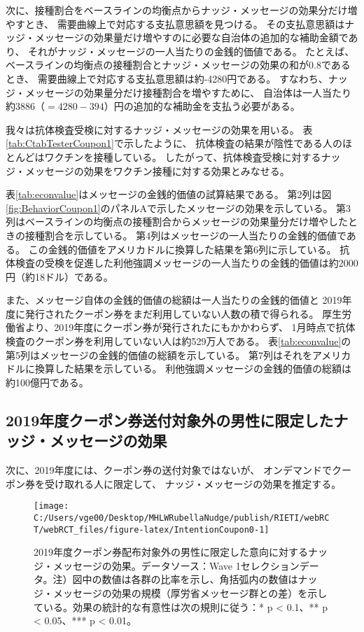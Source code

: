 \documentclass[
  11pt,
  a4paper,
]{article}
\begin{document}
次に、接種割合をベースラインの均衡点からナッジ・メッセージの効果分だけ増やすとき、
需要曲線上で対応する支払意思額を見つける。
その支払意思額はナッジ・メッセージの効果量だけ増やすのに必要な自治体の追加的な補助金額であり、
それがナッジ・メッセージの一人当たりの金銭的価値である。
たとえば、ベースラインの均衡点の接種割合とナッジ・メッセージの効果の和が0.8であるとき、
需要曲線上で対応する支払意思額は約-4280円である。
すなわち、ナッジ・メッセージの効果量分だけ接種割合を増やすために、
自治体は一人当たり約3886（\(=4280-394\)）円の追加的な補助金を支払う必要がある。

我々は抗体検査受検に対するナッジ・メッセージの効果を用いる。
表\ref{tab:CtabTesterCoupon1}で示したように、
抗体検査の結果が陰性である人のほとんどはワクチンを接種している。
したがって、抗体検査受検に対するナッジ・メッセージの効果をワクチン接種に対する効果とみなせる。

表\ref{tab:econvalue}はメッセージの金銭的価値の試算結果である。
第2列は図\ref{fig:BehaviorCoupon1}のパネルAで示したメッセージの効果を示している。
第3列はベースラインの均衡点の接種割合からメッセージの効果量分だけ増やしたときの接種割合を示している。
第4列はメッセージの一人当たりの金銭的価値である。
この金銭的価値をアメリカドルに換算した結果を第6列に示している。
抗体検査の受検を促進した利他強調メッセージの一人当たりの金銭的価値は約2000円（約18ドル）である。

また、メッセージ自体の金銭的価値の総額は一人当たりの金銭的価値と
2019年度に発行されたクーポン券をまだ利用していない人数の積で得られる。
厚生労働省より、2019年度にクーポン券が発行されたにもかかわらず、
1月時点で抗体検査のクーポン券を利用していない人は約529万人である。
表\ref{tab:econvalue}の第5列はメッセージの金銭的価値の総額を示している。
第7列はそれをアメリカドルに換算した結果を示している。
利他強調メッセージの金銭的価値の総額は約100億円である。

\hypertarget{coupon0}{%
\subsection{2019年度クーポン券送付対象外の男性に限定したナッジ・メッセージの効果}\label{coupon0}}

次に、2019年度には、クーポン券の送付対象ではないが、
オンデマンドでクーポン券を受け取れる人に限定して、
ナッジ・メッセージの効果を推定する。

\begin{figure}[t]
\texttt{[image: C:/Users/vge00/Desktop/MHLWRubellaNudge/publish/RIETI/webRCT/webRCT\_files/figure-latex/IntentionCoupon0-1]} \caption{2019年度クーポン券配布対象外の男性に限定した意向に対するナッジ・メッセージの効果。データソース：Wave 1セレクションデータ。注）図中の数値は各群の比率を示し、角括弧内の数値はナッジ・メッセージの効果の規模（厚労省メッセージ群との差）を示している。効果の統計的な有意性は次の規則に従う：* p < 0.1、** p < 0.05、*** p < 0.01。}\label{fig:IntentionCoupon0}
\end{figure}
\end{document}
